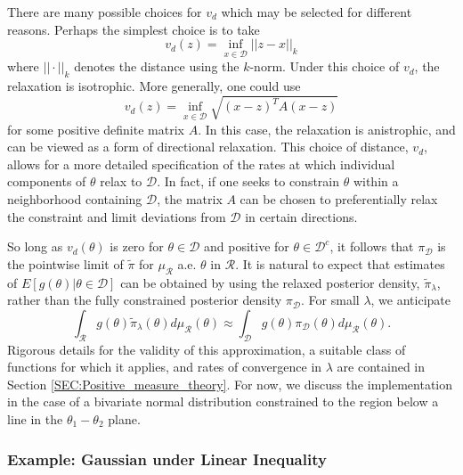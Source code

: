 \documentclass[10pt,fleqn]{article}
\DeclareMathOperator{\1}{\mathbbm{1}}
\begin{document}
{There are many possible choices for $v_d$ which may be selected for different reasons.  Perhaps the simplest choice is to take
\begin{equation}
\label{EQ:Isotrophic_relaxation}
v_d(z) =  \inf_{x\in\mathcal{D}} ||z-x||_k
\end{equation}
where $||\cdot||_k$ denotes the distance using the $k$-norm. Under this choice of $v_d$, the relaxation is isotrophic. More generally, one could use
\begin{equation}
v_d(z) = \inf_{x\in\mathcal{D}} \sqrt{(x-z)^T A (x-z)}\label{EQ:anistrophic_relaxation}
\end{equation} for some positive definite matrix $A$. In this case, the relaxation is anistrophic, and can be viewed as a form of directional relaxation. This choice of distance, $v_d$, allows for a more detailed specification of the rates at which individual components of $\theta$ relax to $\mathcal{D}$.  In fact, if one seeks to constrain $\theta$ within a neighborhood containing $\mathcal{D}$, the matrix $A$ can be chosen to preferentially relax the constraint and limit deviations from $\mathcal{D}$ in certain directions.

So long as $v_d(\theta)$ is zero for $\theta \in \mathcal{D}$ and positive for $\theta\in\mathcal{D}^c$, it follows that $\pi_\mathcal{D}$ is the pointwise limit of $\tilde{\pi}$ for $\mu_\mathcal{R}$ a.e. $\theta$ in $\mathcal{R}.$  It is natural to expect that estimates of $E[g(\theta)|\theta\in\mathcal{D}]$ can be obtained by using the relaxed posterior density, $\tilde{\pi}_\lambda$, rather than the fully constrained posterior density $\pi_\mathcal{D}$. For small $\lambda$, we anticipate
$$\int_\mathcal{R} g(\theta)\tilde{\pi}_\lambda(\theta) d\mu_\mathcal{R}(\theta) \approx \int_\mathcal{D} g(\theta)\pi_\mathcal{D}(\theta) d\mu_\mathcal{R}(\theta) .$$
Rigorous details for the validity of this approximation, a suitable class of functions for which it applies, and rates of convergence in $\lambda$ are contained in Section \ref{SEC:Positive_measure_theory}. For now, we discuss the implementation in the case of a bivariate normal distribution constrained to the region below a line in the $\theta_1-\theta_2$ plane.

\subsubsection{Example: Gaussian  under Linear Inequality}


}
\end{document}
